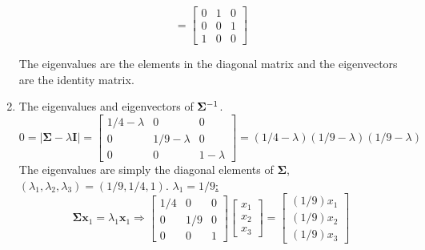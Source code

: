 \begin{enumerate}[label=(\alph*)]
\[                =
                \begin{bmatrix}
                    0 & 1 & 0 \\
                    0 & 0 & 1 \\
                    1 & 0 & 0
                \end{bmatrix}
            \]
            \par
            The eigenvalues are the elements in the diagonal matrix and the eigenvectors are the identity matrix.
            \item The eigenvalues and eigenvectors of $\bold{\Sigma}^{-1}$.
            \[
                 0 = \left|\mathbf{\Sigma} - \lambda\mathbf{I}\right|
                 =
                 \begin{bmatrix}
                    1/4-\lambda & 0 & 0 \\
                    0 & 1/9-\lambda & 0 \\
                    0 & 0 & 1-\lambda
                 \end{bmatrix}
                 =
                 \left(1/4-\lambda\right)\left(1/9-\lambda\right)\left(1/9-\lambda\right)
            \]
            The eigenvalues are simply the diagonal elements of $\mathbf{\Sigma}$, $\left(\lambda_1, \lambda_2, \lambda_3\right) = \left(1/9,1/4,1\right)$.
            \newline
            \newline
            \underline{$\lambda_1 = 1/9$:}
            \[
                \mathbf{\Sigma}\mathbf{x}_1 = \lambda_1\mathbf{x}_1
                \Rightarrow
                \begin{bmatrix}
                    1/4 & 0 & 0\\
                    0 & 1/9 & 0\\
                    0 & 0 & 1
                \end{bmatrix}
                \begin{bmatrix}
                    x_1 \\
                    x_2 \\
                    x_3
                \end{bmatrix}
                =
                \begin{bmatrix}
                    (1/9)x_1 \\
                    (1/9)x_2 \\
                    (1/9)x_3
                \end{bmatrix}
            \]

\end{enumerate}
